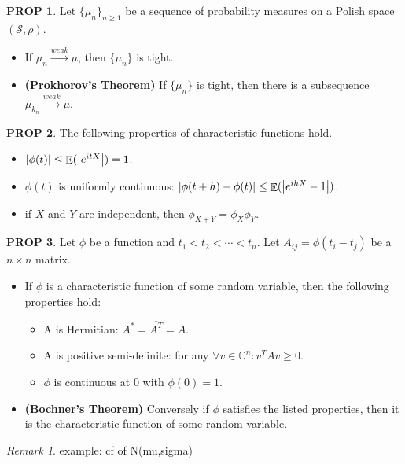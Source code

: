 \documentclass[hidelinks,11pt]{article}
\theoremstyle{definition}
\theoremstyle{dotless}
\newtheorem{prop}{PROP}[section]
\theoremstyle{remark}
\newtheorem*{remark}{Remark}
\DeclareMathOperator{\E}{\mathbb{E}}
\DeclareMathOperator{\1}{\mathbf{1}}
\begin{document}
\begin{prop}
Let $\{\mu_n\}_{n\geq1}$ be a sequence of probability measures on a Polish space $(\mathcal{S},\rho)$.\begin{itemize}
    \item If $\mu_n\xrightarrow{weak}\mu$, then $\{\mu_n\}$ is tight.
    \item \textup{\textbf{(Prokhorov's Theorem)}} If $\{\mu_n\}$ is tight, then there is a subsequence $\mu_{k_n}\xrightarrow{weak}\mu$.
\end{itemize}
\end{prop}

\begin{prop}
The following properties of characteristic functions hold.
\begin{itemize}
    \item $\abs{\phi(t)}\leq\E(\abs{e^{itX}})=1$.
    \item $\phi(t)$ is uniformly continuous: $\abs{\phi(t+h)-\phi(t)}\leq\E(\abs{e^{ihX}-1})$.
    \item if $X$ and $Y$ are independent, then $\phi_{X+Y}=\phi_X\phi_Y$.
\end{itemize}
\end{prop}

\begin{prop}
Let $\phi$ be a function and $t_1<t_2<\cdots<t_n$. Let $A_{ij}=\phi(t_i-t_j)$ be a $n\times n$ matrix.\begin{itemize}
    \item If $\phi$ is a characteristic function of some random variable, then the following properties hold:\begin{itemize}
        \item A is Hermitian: $A^*=\overline{A^T}=A$.
        \item A is positive semi-definite: for any $\forall v\in\mathbb{C}^n:v^TAv\geq0$.
        \item $\phi$ is continuous at 0 with $\phi(0)=1$.
    \end{itemize}
    \item \textup{\textbf{(Bochner's Theorem)}} Conversely if $\phi$ satisfies the listed properties, then it is the characteristic function of some random variable.
\end{itemize}
\end{prop}

\begin{remark}
example: cf of N(mu,sigma)
\end{remark}
\end{document}
